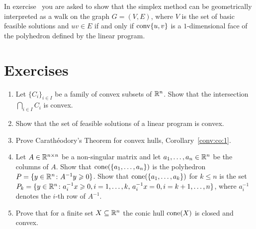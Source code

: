 In exercise~\label{item:18} you are asked to show that the simplex
method can be geometrically interpreted as a walk on the graph $G =
(V,E)$, where $V$ is the set of basic feasible solutions and $uv\in  E$
if and only if $\operatorname{conv}\{u,v\}$ is a $1$-dimensional face of the
polyhedron defined by the linear program. 






\section*{Exercises}

\begin{enumerate}[1)]
\item Let $\{C_i\}_{i\in I}$ be a family of convex subsets of $\mathbb{R}^n$.
  Show that the intersection $\bigcap_{i\in I} C_i$ is convex.
\item Show that the set of feasible solutions  of a linear program  is
  convex. \label{conv:item:1}
\item Prove Carath\'eodory's Theorem for convex hulls,
  Corollary~\ref{conv:co:1}. 
\item Let $A \in \mathbb{R}^{n\times n}$ be a non-singular matrix and let
  $a_1,\ldots,a_n\in \mathbb{R}^n$ be the columns of $A$.  Show that
  $\mathrm{cone}(\{a_1,\ldots,a_n\})$ is the polyhedron $P = \{ y \in \mathbb{R}^n \colon
  A^{-1} y\geqslant0\}$. \label{conv:item:3} Show that $\mathrm{cone}(\{a_1,\ldots,a_k\})$ for
  $k\leq n$ is the set $P_k = \{y \in \mathbb{R}^n \colon
  a_i^{-1} x\geqslant0, i=1,\ldots,k, \, a_i^{-1}x = 0, i=k+1,\ldots,n\}$, where
  $a_i^{-1}$ denotes the $i$-th row of $A^{-1}$. 
\item Prove that for a finite set $X\subseteq\mathbb{R}^n$ the conic hull $\mathrm{cone}(X)$ is closed
  and convex. \label{conv:item:2} 
  

\end{enumerate}
